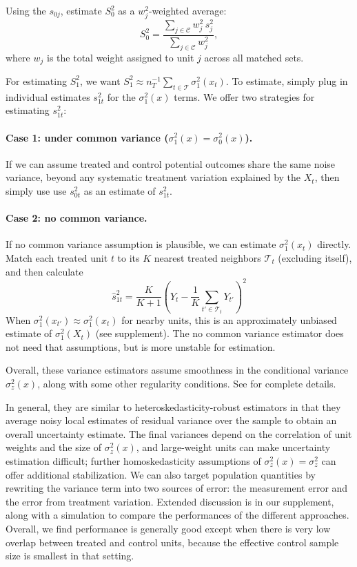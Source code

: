 \documentclass[11pt]{article}
\begin{document}
Using the $s_{0j}$, estimate $S_0^2$ as a $w_j^2$-weighted average:
\[
  S^2_0
  = \frac{\sum_{j\in\mathcal{C}} w_j^2\, s_j^2}{\sum_{j\in\mathcal{C}} w_j^2} ,
\]
where $w_j$ is the total weight assigned to unit $j$ across all matched sets.

For estimating $S^2_1$, we want $S^2_1 \approx n_T^{-1}\sum_{t\in\mathcal{T}}\sigma^2_1(x_t)$.
To estimate, simply plug in individual estimates $s_{1t}^2$ for the $\sigma^2_1(x)$ terms.
We offer two strategies for estimating $s^2_{1t}$:

\paragraph{Case 1: under common variance ($\sigma^2_1(x)=\sigma^2_0(x)$).}
If we can assume treated and control potential outcomes share the same noise variance, beyond any systematic treatment variation explained by the $X_t$, then simply use use $s_{0t}^2$ as an estimate of $s_{1t}^2$.

\paragraph{Case 2: no common variance.}
If no common variance assumption is plausible, we can estimate $\sigma^2_1(x_t)$ directly.
Match each treated unit $t$ to its $K$ nearest treated neighbors $\mathcal{T}_t$ (excluding itself), and then calculate
\[
  \hat{s}^2_{1t} = \frac{K}{K+1} \left(Y_t - \frac{1}{K}\sum_{t'\in\mathcal{T}_t} Y_{t'}\right)^2
\]
When $\sigma^2_1(x_{t'})\approx\sigma^2_1(x_t)$ for nearby units, this is an approximately unbiased estimate of $\sigma^2_1(X_t)$ (see supplement).
The no common variance estimator does not need that assumptions, but is more unstable for estimation.

Overall, these variance estimators assume smoothness in the conditional variance $\sigma^2_z(x)$, along with some other regularity conditions.
See \citet{meng2025varianceestimationmatchingreweighting} for complete details.

In general, they are similar to heteroskedasticity-robust estimators in that they average noisy local estimates of residual variance over the sample to obtain an overall uncertainty estimate.
The final variances depend on the correlation of unit weights and the size of $\sigma^2_z(x)$, and large-weight units can make uncertainty estimation difficult; further homoskedasticity assumptions of $\sigma^2_z(x)=\sigma_z^2$ can offer additional stabilization.
We can also target population quantities by rewriting the variance term into two sources of error: the measurement error and the error from treatment variation.
Extended discussion is in our supplement, along with a simulation to compare the performances of the different approaches.
Overall, we find performance is generally good except when there is very low overlap between treated and control units, because the effective control sample size is smallest in that setting.
\end{document}
